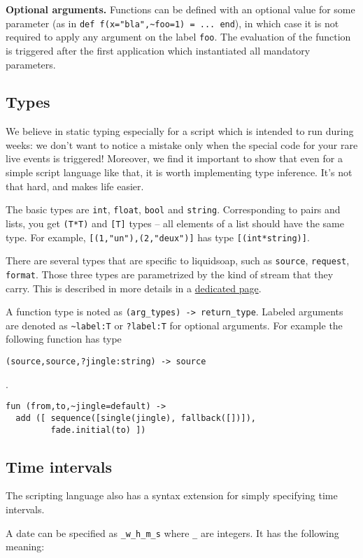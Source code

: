 \textbf{Optional arguments.} Functions can be defined with an optional value for some parameter (as in \verb+def f(x="bla",~foo=1) = ... end+), in which case it is not required to apply any argument on the label \verb+foo+. The evaluation of the function is triggered after the first application which instantiated all mandatory parameters.

\subsection{Types}
We believe in static typing especially for a script which is intended to run during weeks: we don't want to notice a mistake only when the special code for your rare live events is triggered! Moreover, we find it important to show that even for a simple script language like that, it is worth implementing type inference. It's not that hard, and makes life easier.

The basic types are \verb+int+, \verb+float+, \verb+bool+ 
and \verb+string+.
Corresponding to pairs and lists,
you get \verb+(T*T)+ and \verb+[T]+ types --
all elements of a list should have the same type.
For example, \verb+[(1,"un"),(2,"deux")]+
has type \verb+[(int*string)]+.

There are several types that are specific to liquidsoap, such as
\verb+source+, \verb+request+, \verb+format+.
Those three types are parametrized by the kind of stream that they
carry. This is described in more details in a
\href{stream_content.html}{dedicated page}.

A function type is noted as \verb+(arg_types) -> return_type+. Labeled arguments are denoted as \verb+~label:T+ or \verb+?label:T+ for optional arguments. For example the following function has type
\begin{verbatim}
(source,source,?jingle:string) -> source
\end{verbatim}
.

\begin{verbatim}
fun (from,to,~jingle=default) ->
  add ([ sequence([single(jingle), fallback([])]),
         fade.initial(to) ])
\end{verbatim}
\subsection{Time intervals}
The scripting language also has a syntax extension for simply specifying time intervals.

A date can be specified as \verb+_w_h_m_s+ where \verb+_+ are integers. It has the following meaning:

